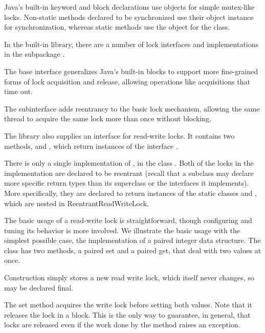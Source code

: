Java's built-in  keyword and block declarations use
objects for simple mutex-like locks.  Non-static methods declared to
be synchronized use their object instance for synchronization, whereas
static methods use the object for the class.  

In the built-in  library, there are a
number of lock interfaces and implementations in the subpackage
.

The  base interface  generalizes Java's
built-in  blocks to support more fine-grained forms
of lock acquisition and release, allowing operations like acquisitions
that time out.  

The subinterface  adds reentrancy to the basic
lock mechanism, allowing the same thread to acquire the same lock more
than once without blocking.

The  library also supplies an interface
 for read-write locks.  It contains two
methods,  and , which return
instances of the interface .

There is only a single implementation of , in
the class .  Both of the locks in the
implementation are declared to be reentrant (recall that a subclass
may declare more specific return types than its superclass or the
interfaces it implements).  More specifically, they are declared to
return instances of the static classes 
and , which are nested in {ReentrantReadWriteLock}.

The basic usage of a read-write lock is straightforward, though
configuring and tuning its behavior is more involved.  We illustrate
the basic usage with the simplest possible case, the implementation of
a paired integer data structure.  The class has two methods, a paired
set and a paired get, that deal with two values at once.  

Construction simply stores a new read write lock, which itself
never changes, so may be declared final.
%
%

The set method acquires the write lock before setting both values.
%
%
Note that it releases the lock in a  block.  This is
the only way to guarantee, in general, that locks are released even if
the work done by the method raises an exception.


